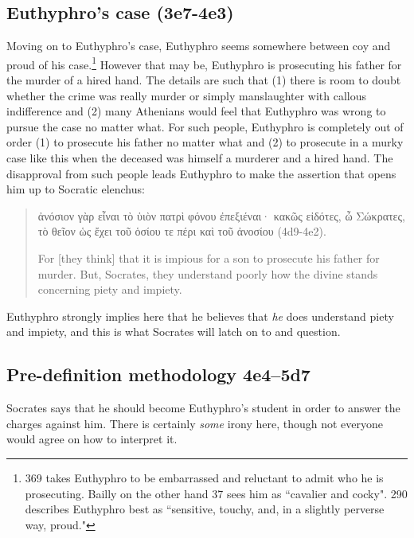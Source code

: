 \documentclass[11pt]{article}
\begin{document}
\subsection{Euthyphro's case (3e7-4e3)}

Moving on to Euthyphro's case, Euthyphro seems somewhere between coy and
proud of his case.\footnote{\citet{geach1966} 369 takes Euthyphro to be
embarrassed and reluctant to admit who he is prosecuting.  Bailly on the
other hand \citeyearpar{bailly2003} 37 sees him as ``cavalier and cocky".
\citet{nehamas1975} 290 describes Euthyphro best as ``sensitive, touchy,
and, in a slightly perverse way, proud."}  However that may be, Euthyphro
is prosecuting his father for the murder of a hired hand.  The details are
such that (1) there is room to doubt whether the crime was really murder or
simply manslaughter with callous indifference and (2) many Athenians would
feel that Euthyphro was wrong to pursue the case no matter what.  For such
people, Euthyphro is completely out of order (1) to prosecute his father no
matter what and (2) to prosecute in a murky case like this when the
deceased was himself a murderer and a hired hand.  The disapproval from
such people leads Euthyphro to make the assertion that opens him up to
Socratic elenchus:

\begin{quote}
    ἀνόσιον γὰρ εἶναι τὸ ὑιὸν πατρὶ φόνου ἐπεξιέναι· κακῶς εἰδότες,
    ὦ Σώκρατες, τὸ θεῖον ὡς ἔχει τοῦ ὁσίου τε πέρι καὶ τοῦ ἀνοσίου
    (4d9-4e2).

    For [they think] that it is impious for a son to prosecute his father
    for murder.  But, Socrates, they understand poorly how the divine stands
    concerning piety and impiety.
\end{quote}

Euthyphro strongly implies here that he believes that \emph{he} does
understand piety and impiety, and this is what Socrates will latch on to
and question.

\subsection{Pre-definition methodology 4e4--5d7}

Socrates says that he should become Euthyphro's student in order to answer
the charges against him.  There is certainly \emph{some} irony here, though
not everyone would agree on how to interpret it.
\end{document}
